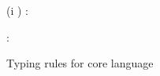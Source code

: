 \begin{figure}
\begin{minipage}[t]{0.4\textwidth}
\begin{smathpar}
{      (\forall i \numleq {})
   }
   {
      \vdash {}: 
   }
   \end{smathpar}
   \end{minipage}%
   \hspace{1.5cm}
   \begin{minipage}[t]{0.48\textwidth}%
   {\small \flushleft {}%
   \hfill {}}
   \begin{smathpar}
      {
         \Gamma \vdash {}: \Delta
      }
   \end{smathpar}
   \end{minipage}
   \caption{Typing rules for core language}
   \label{fig:core-language:typing}
   \end{figure}
   